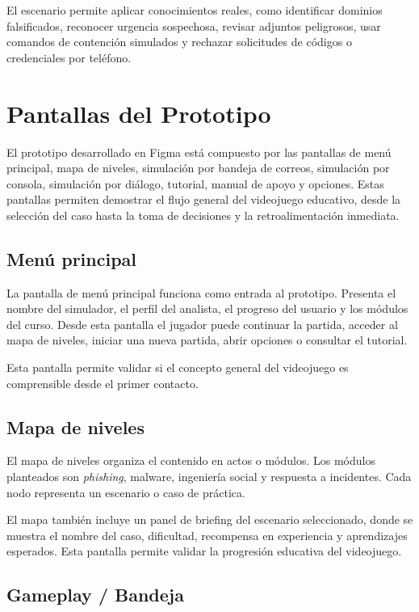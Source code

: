 ﻿\documentclass[12pt]{article}
\begin{document}
El escenario permite aplicar conocimientos reales, como identificar dominios falsificados, reconocer urgencia sospechosa, revisar adjuntos peligrosos, usar comandos de contenci\'{o}n simulados y rechazar solicitudes de c\'{o}digos o credenciales por tel\'{e}fono.

\section{Pantallas del Prototipo}

El prototipo desarrollado en Figma est\'{a} compuesto por las pantallas de men\'{u} principal, mapa de niveles, simulaci\'{o}n por bandeja de correos, simulaci\'{o}n por consola, simulaci\'{o}n por di\'{a}logo, tutorial, manual de apoyo y opciones. Estas pantallas permiten demostrar el flujo general del videojuego educativo, desde la selecci\'{o}n del caso hasta la toma de decisiones y la retroalimentaci\'{o}n inmediata.

\subsection{Men\'{u} principal}

La pantalla de men\'{u} principal funciona como entrada al prototipo. Presenta el nombre del simulador, el perfil del analista, el progreso del usuario y los m\'{o}dulos del curso. Desde esta pantalla el jugador puede continuar la partida, acceder al mapa de niveles, iniciar una nueva partida, abrir opciones o consultar el tutorial.

Esta pantalla permite validar si el concepto general del videojuego es comprensible desde el primer contacto.

\subsection{Mapa de niveles}

El mapa de niveles organiza el contenido en actos o m\'{o}dulos. Los m\'{o}dulos planteados son \textit{phishing}, malware, ingenier\'{i}a social y respuesta a incidentes. Cada nodo representa un escenario o caso de pr\'{a}ctica.

El mapa tambi\'{e}n incluye un panel de briefing del escenario seleccionado, donde se muestra el nombre del caso, dificultad, recompensa en experiencia y aprendizajes esperados. Esta pantalla permite validar la progresi\'{o}n educativa del videojuego.

\subsection{Gameplay / Bandeja}
\end{document}

